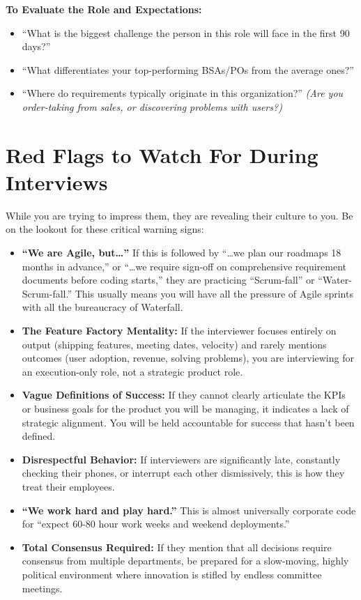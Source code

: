 \documentclass[
  11pt,
  openany,
  oneside]{book}
\providecommand{\tightlist}{%
  \setlength{\itemsep}{0pt}\setlength{\parskip}{0pt}}
\begin{document}
\textbf{To Evaluate the Role and Expectations:}

\begin{itemize}
\tightlist
\item
  ``What is the biggest challenge the person in this role will face in
  the first 90 days?''
\item
  ``What differentiates your top-performing BSAs/POs from the average
  ones?''
\item
  ``Where do requirements typically originate in this organization?''
  \emph{(Are you order-taking from sales, or discovering problems with
  users?)}
\end{itemize}

\bigskip

\section{Red Flags to Watch For During
Interviews}\label{red-flags-to-watch-for-during-interviews}

While you are trying to impress them, they are revealing their culture
to you. Be on the lookout for these critical warning signs:

\begin{itemize}
\tightlist
\item
  \textbf{``We are Agile, but\ldots{}''} If this is followed by
  ``\ldots we plan our roadmaps 18 months in advance,'' or ``\ldots we
  require sign-off on comprehensive requirement documents before coding
  starts,'' they are practicing ``Scrum-fall'' or ``Water-Scrum-fall.''
  This usually means you will have all the pressure of Agile sprints
  with all the bureaucracy of Waterfall.
\item
  \textbf{The Feature Factory Mentality:} If the interviewer focuses
  entirely on output (shipping features, meeting dates, velocity) and
  rarely mentions outcomes (user adoption, revenue, solving problems),
  you are interviewing for an execution-only role, not a strategic
  product role.
\item
  \textbf{Vague Definitions of Success:} If they cannot clearly
  articulate the KPIs or business goals for the product you will be
  managing, it indicates a lack of strategic alignment. You will be held
  accountable for success that hasn't been defined.
\item
  \textbf{Disrespectful Behavior:} If interviewers are significantly
  late, constantly checking their phones, or interrupt each other
  dismissively, this is how they treat their employees.
\item
  \textbf{``We work hard and play hard.''} This is almost universally
  corporate code for ``expect 60-80 hour work weeks and weekend
  deployments.''
\item
  \textbf{Total Consensus Required:} If they mention that all decisions
  require consensus from multiple departments, be prepared for a
  slow-moving, highly political environment where innovation is stifled
  by endless committee meetings.
\end{itemize}
\end{document}
